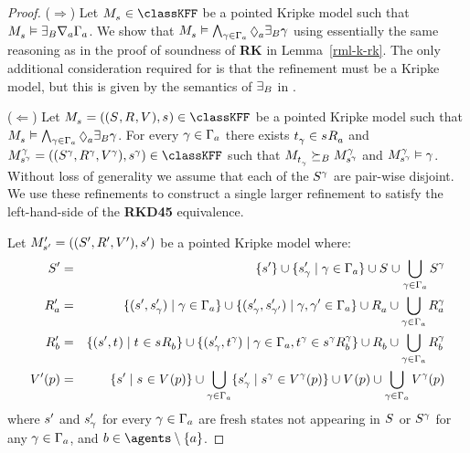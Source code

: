\begin{proof}
($\Rightarrow$) Let $\kPModel{\kStateS} \in \classKFF$ be a pointed Kripke model such that $\kPModel{\kStateS} \entails \somerefsBs \coversA \Gamma_\agentA$.
We show that $\kPModel{\kStateS} \entails \bigwedge_{\gamma \in \Gamma_\agentA} \possibleA \somerefsBs \gamma$ using essentially the same reasoning as in the proof of soundness of {\bf RK} in Lemma~\ref{rml-k-rk}.
The only additional consideration required for \logicRmlKFF{} is that the refinement must be a \classKFF{} Kripke model, but this is given by the semantics of $\somerefsBs$ in \logicRmlKFF{}.

($\Leftarrow$) Let $\kPModelAndTuple{\kStateS} \in \classKFF$ be a pointed Kripke model such that $\kPModel{\kStateS} \entails \bigwedge_{\gamma \in \Gamma_\agentA} \possibleA \somerefsBs \gamma$.
For every $\gamma \in \Gamma_\agentA$ there exists $\kStateT_\gamma \in \kSuccessorsA{\kStateS}$ and $\kPModelAndTuple[\gamma]{\kStateS[\gamma]} \in \classKFF$ such that $\kPModel{\kStateT_\gamma} \simulatesBs \kPModel[\gamma]{\kStateS[\gamma]}$ and $\kPModel[\gamma]{\kStateS[\gamma]} \entails \gamma$.
Without loss of generality we assume that each of the $\kStates[\gamma]$ are pair-wise disjoint.
We use these refinements to construct a single larger refinement to satisfy the left-hand-side of the {\bf RKD45} equivalence.

Let $\kPModelAndTupleP{\kStateSP}$ be a pointed Kripke model where:
\begin{eqnarray*}
    \kStatesP &=& \{\kStateSP\} \cup \{\kStateSP_\gamma \mid \gamma \in \Gamma_\agentA\} \cup \kStates \cup \bigcup_{\gamma \in \Gamma_\agentA} \kStates[\gamma]\\
    \kAccessibilityPA &=& \{(\kStateSP, \kStateSP_\gamma) \mid \gamma \in \Gamma_\agentA\} \cup \{(\kStateSP_\gamma, \kStateSP_{\gamma'}) \mid \gamma, \gamma' \in \Gamma_\agentA\} \cup \kAccessibilityA \cup \bigcup_{\gamma \in \Gamma_\agentA} \kAccessibilityA[\gamma]\\
    \kAccessibilityPB &=& \{(\kStateSP, \kStateT) \mid \kStateT \in \kSuccessorsB{\kStateS}\} \cup \{(\kStateSP_\gamma, \kStateT[\gamma]) \mid \gamma \in \Gamma_\agentA, \kStateT[\gamma] \in \kSuccessorsB[\gamma]{\kStateS[\gamma]}\} \cup \kAccessibilityB \cup \bigcup_{\gamma \in \Gamma_\agentA} \kAccessibilityB[\gamma]\\
    \kValuationP(\atomP) &=& \{\kStateSP \mid \kStateS \in \kValuation(\atomP)\} \cup \bigcup_{\gamma \in \Gamma_\agentA} \{\kStateSP_\gamma \mid \kStateS[\gamma] \in \kValuation[\gamma](\atomP)\} \cup \kValuation(\atomP) \cup \bigcup_{\gamma \in \Gamma_\agentA} \kValuation[\gamma](\atomP)
\end{eqnarray*}
where $\kStateSP$ and $\kStateSP_\gamma$ for every $\gamma \in \Gamma_\agentA$ are fresh states not appearing in $\kStates$ or $\kStates[\gamma]$ for any $\gamma \in \Gamma_\agentA$, and $\agentB \in \agents \setminus \{\agentA\}$.


\end{proof}
